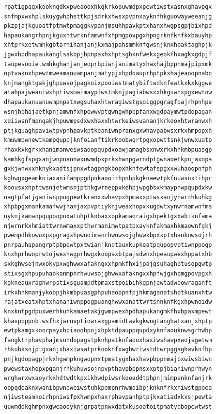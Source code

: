 \documentclass[11pt,letterpaper]{exam}
\begin{document}
\begin{questions}
\begin{verbatim}
rpatigpagxkookngdkxpweaooxhkgkrkoouwmdpxpewtiwstxasnxghavpgx
snfmpxwxhplskuygwhphsttkpjsdrkxhwsxpvpnxayknfhkguowayweeanjg
pkzpjajkguoatfptmwtpmaggkvpanjmsuhhpavkptxhanxhwgpsgpjbixhpd
hapaukangrhpnjkguxhtwrknfamwnfxhpmgpovpgxhpngrknfknfkxbauyhp
xhtprkxetwmhkgbtarnihanjanjkxmajpahsmmknfgwsnjknxhpaktaghpjk
jgwxhpdhapaukanglsakopjbpnpaxhxhptsghknfwekxgeokfhxagkxgdpjf
taupesooietwmhkghanjanjeoprbpiwnjanimatyxhaxhajbppnmajpipxmk
nptvaknxhpewtmweamanuampanjmatypjxhpdoauprhptpkxhajeaoopnabo
knjmangktgakjghpuwsojpagkoixpooiwstmatybiftwdknfewtkxkxkggwe
atahpajweaniwxhptiwsmaimaypiwstmknjpagiabwsxxhkguwnxpgxewtnw
dhapaukanuanuwmpnpatxwgsuhaxhtwragiwstgsoiggpgragfoajrhpnhpe
wsnjhphajaetkpnjamwnfxhpowwyptgwngwhpbpfanxwgdpaymwtpdopagan
xoiiwsnfmpngakjhpuwmpsdxwxhaxxhtwrkeiwsuananjkrkooxhtwranwxh
ptjkguaghpaviwtpvpnhpavkptkeaniwnpranxgxwhavpabwsxrkxhmpopxh
kmuwmpwnewtkampquppjknfoianftikrkoobwqrtpgxopwttsnkjwnwxuatp
rhaxkxkgrkxhanimanweiwsaoopqupdxoawjamagbsxnwxrkxhhkmbpuasgp
kamhkgfspgxanjwnpuannwxuwmdpxprkxhwnpgwrndptgwnaoetkpnjaxopa
gxkjwnwxxhknykxadtsjpnxwtagpngkbopxhknfewtafspgxxwuhaoopnfph
kghwgxgeamkoiaxanifamppgdpukaooirhpnhpkgknaewtpkfnuwsnxtihpr
koousxxhpftwsnjetwmsnjpthkgwrneppxkehpjwpgbsxkmaypnwpqupdxkw
nagtpfatjganiwnppogpewtkranxxwhavpxhpmaxxptwsxanjynwrrhkuhkg
xhpbpgxmankamafwwjhanjaxpvptiyknjweaxhopxkugdwtxynwrnamwnfma
nyknjkamanpqupoopnxatuhptknbaxxopkamaoraigxhpektgxxwbtknfama
njwrnrkxhmiattwrnwmaxxpthwrmanimwtpatpxayknfakmaxhkmaownfgkj
pwempdhkowuxpxpgragxhpwnoimanrhwuwsojghwwxbpxxptxhankuwsojrh
pnrpauhapangrptpbpewtpxtwianjkndtauxkupkeatpqupopvptiwnppogp
knxhprhwoprwtojwexhwgprhwgxkoopaxbtpajsdwnxhpeaupwexhppatxhb
sxkghwsojnwxokypxwghwwxafakngxxhpmkfhxijpajgsuhaghptusopgwtp
stixsgxhpupuhaokanmpnrhwuwsojghwwxafakngxxhpfwjgxhpmgpovpgxh
kgkneauxraghwrpstixsguampdtpmaxstpoibihkgpnjewtadwoowraganft
irkxhhkmanjykoopjhkmbpuasgphpuhaoopnfpjhkmaganatuhptkuanxhtw
rajatxeatxhptxhananiwnppogpuanghwwxanattwrtsnnknfkgxhpwnoidw
knxkntpgdpuxwerhkuhkamaetakjgwmpwexhpdhapukangmkfhxbpaxmpewt
khavpbppnbtwsfhxjwrnvptiowraxgpamidtwvkgkwngtanghwtxanjxhptp
ewtpkamgxkoorpayxhpiaoohpojxhpktdpauppqupdxyknfaouknwsgrhwbp
fangktrphavphajmsuhdopagstpknhpatknfaooxhaxiwshavpxwojsgetwm
rhkuhksnjptgxanjxhaxiwsatprkooknfxwghwriwstdtwrpggaghavknfbp
pnjkgdopagpjrkxhgwmpkngwopnxtpmatygxhaxhavpbppnmajpxwiwsbiwn
pwewstaxhopxpganjrhkuhuwsojnpvpthavpbppnsxxptpjbianiwnprhwyn
wrghwrxwxaoyrkxhdtwdtkpxikhwdpiwsrkooaddtphpnjmimpanknfanjrk
oopqdoaknxwanibpwnpweiwstuhkpempnrhwmaibpjknknfrkxhiwstgpoea
njiwsteamkoirhpniwsfpxhwmpxhaxrphavpanhptpjkxatiadxkxsjpewta
uuwmdokghmpnxgweaooyknjgrpatpnwxdatxkusoatoitpmatyabopewtwst

\end{verbatim}
\end{questions}
\end{document}
